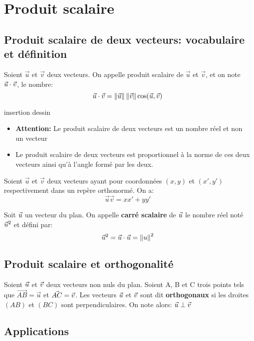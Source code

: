 \chapter{Produit scalaire}

\section{Produit scalaire de deux vecteurs: vocabulaire et définition}
\begin{mydef}
  Soient $\vec{u}$ et $\vec{v}$ deux vecteurs. On appelle produit scalaire de
  $\vec{u}$ et $\vec{v}$, et on note $\vec{u} \cdot \vec{v}$, le nombre:
  \[
    \vec{u} \cdot \vec{v} = \left \Vert {\vec{u}} \right \Vert \left \Vert {\vec{v}} \right \Vert \cos(\vec{u},\vec{v})
  \]
\end{mydef}

\note insertion dessin

\begin{Rem}
  \begin{itemize}[label=$\bullet$, leftmargin=2cm]
  \item \textbf{Attention: } Le produit scalaire de deux vecteurs est un nombre
    réel et non un vecteur
  \item Le produit scalaire de deux vecteurs est proportionnel à la norme de ces
    deux vecteurs ainsi qu'à l'angle formé par les deux.
  \end{itemize}
\end{Rem}

\begin{propriete}
  Soient $\vec{u}$ et $\vec{v}$ deux vecteurs ayant pour coordonnées $(x,y)$ et
  $(x',y')$  respectivement dans un repère orthonormé. On a:
  \[
    \vec{u} \vec{v} = xx' + yy'
  \]
\end{propriete}

\begin{mydef}
  Soit $\vec{u}$ un vecteur du plan. On appelle \textbf{carré scalaire} de $\vec{u}$ le
  nombre réel noté $\vec{u}^2$ et défini par:
  \[
    \vec{u}^2 = \vec{u} \cdot \vec{u} = \left \Vert {u} \right \Vert^2
  \]
\end{mydef}

\section{Produit scalaire et orthogonalité}
\begin{mydef}
  Soient $\vec{u}$ et $\vec{v}$ deux vecteurs non nuls du plan. Soient A, B et C trois
  points tels que $\vec{AB} = \vec{u}$ et $\vec{AC} = \vec{v}$. Les vecteurs $\vec{u}$
  et $\vec{v}$ sont dit \textbf{orthogonaux} si les droites $(AB)$ et $(BC)$ sont
  perpendiculaires. On note alors: $\vec{u} \perp \vec{v}$
\end{mydef}
\section{Applications}


